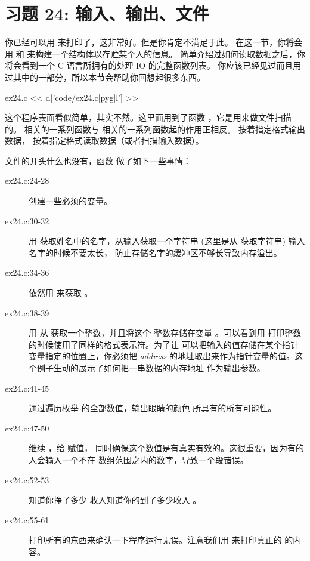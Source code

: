 \chapter{习题 24: 输入、输出、文件}

你已经可以用  来打印了，这非常好。但是你肯定不满足于此。 
在这一节，你将会用  和  来构建一个结构体以存贮某个人的信息。
简单介绍过如何读取数据之后，你将会看到一个 C 语言所拥有的处理 IO 的完整函数列表。
你应该已经见过而且用过其中的一部分，所以本节会帮助你回想起很多东西。

\begin{code}{ex24.c}
<< d['code/ex24.c|pyg|l'] >>
\end{code}

这个程序表面看似简单，其实不然。这里面用到了函数 ，它是用来做文件扫描的。
  相关的一系列函数与  相关的一系列函数起的作用正相反。 
  按着指定格式输出数据， 按着指定格式读取数据（或者扫描输入数据）。

文件的开头什么也没有，函数  做了如下一些事情：

\begin{description}
\item[ex24.c:24-28] 创建一些必须的变量。
\item[ex24.c:30-32] 用  获取姓名中的名字，从输入获取一个字符串
    (这里是从  获取字符串) 输入名字的时候不要太长，
    防止存储名字的缓冲区不够长导致内存溢出。
\item[ex24.c:34-36] 依然用  来获取  。
\item[ex24.c:38-39] 用  从  获取一个整数，并且将这个
    整数存储在变量 。可以看到用  
    打印整数的时候使用了同样的格式表示符。为了让 
    可以把输入的值存储在某个指针变量指定的位置上，你必须把 \emph{address}
    的地址取出来作为指针变量的值。这个例子生动的展示了如何把一串数据的内存地址
    作为输出参数。
\item[ex24.c:41-45] 通过遍历枚举  的全部数值，输出眼睛的颜色
    所具有的所有可能性。
\item[ex24.c:47-50] 继续 ，给  赋值， 
    同时确保这个数值是有真实有效的。这很重要，因为有的人会输入一个不在 
    数组范围之内的数字，导致一个段错误。
\item[ex24.c:52-53] 知道你挣了多少  收入知道你的到了多少收入 
    。
\item[ex24.c:55-61] 打印所有的东西来确认一下程序运行无误。注意我们用 
     来打印真正的  的内容。
\end{description}


